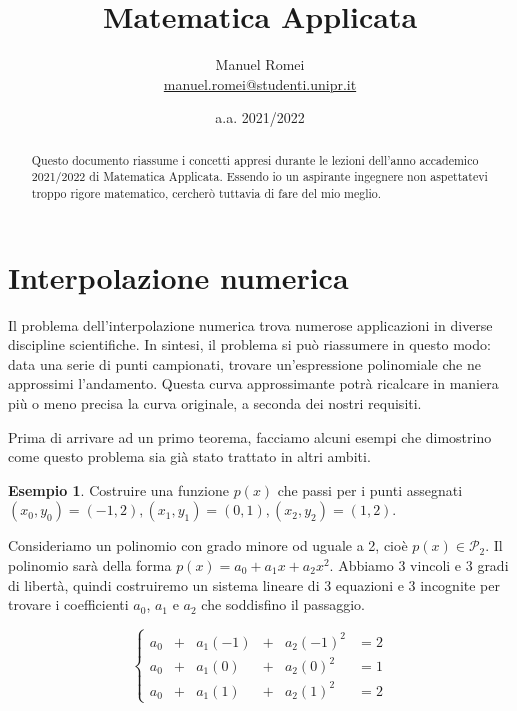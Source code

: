 \documentclass{article}
\title{Matematica Applicata}
\author{Manuel Romei \\ \href{mailto:manuel.romei@studenti.unipr.it}{manuel.romei@studenti.unipr.it}}
\date{a.a. 2021/2022}
\theoremstyle{plain}
\theoremstyle{plain}
\theoremstyle{definition}
\theoremstyle{definition}
\newtheorem{esempio}{Esempio}
\begin{document}
\maketitle

\begin{abstract}
	Questo documento riassume i concetti appresi durante le lezioni dell'anno accademico 2021/2022 di Matematica Applicata. Essendo io un aspirante ingegnere non aspettatevi troppo rigore matematico, cercherò tuttavia di fare del mio meglio.
\end{abstract}

\section{Interpolazione numerica}
Il problema dell'interpolazione numerica trova numerose applicazioni in diverse discipline scientifiche. In sintesi, il problema si può riassumere in questo modo: data una serie di punti campionati, trovare un'espressione polinomiale che ne approssimi l'andamento. Questa curva approssimante potrà ricalcare in maniera più o meno precisa la curva originale, a seconda dei nostri requisiti.

Prima di arrivare ad un primo teorema, facciamo alcuni esempi che dimostrino come questo problema sia già stato trattato in altri ambiti.

\begin{esempio}
	Costruire una funzione $p(x)$ che passi per i punti assegnati $(x_0, y_0)=(-1,2), (x_1, y_1)=(0,1), (x_2, y_2)=(1,2)$.
\end{esempio}

Consideriamo un polinomio con grado minore od uguale a 2, cioè $p(x)\in \mathcal{P}_{2}$. Il polinomio sarà della forma $p(x)=a_0+a_{1}x+a_{2}x^2$. Abbiamo 3 vincoli e 3 gradi di libertà, quindi costruiremo un sistema lineare di 3 equazioni e 3 incognite per trovare i coefficienti $a_0$, $a_1$ e $a_2$ che soddisfino il passaggio.

\begin{equation*}
	\left\{
	\begin{alignedat}{3}
		a_{0} & +{} &  a_{1}(-1) & +{} & a_{2}(-1)^2 & = 2 \\
		a_{0} & +{} &  a_{1}(0) & +{} &  a_{2}(0)^2 & = 1 \\
		a_{0} & +{} & a_{1}(1) & +{} & a_{2}(1)^2 & = 2
	\end{alignedat}
	\right.
\end{equation*}
\end{document}

